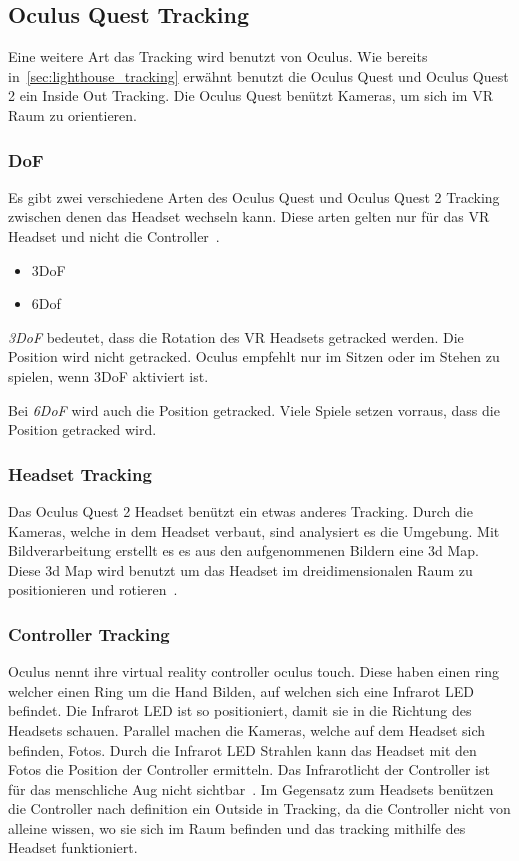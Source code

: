\subsection{Oculus Quest Tracking}
\label{sec:oculus_quest_tracking}

Eine weitere Art das Tracking wird benutzt von Oculus.
Wie bereits in~\ref{sec:lighthouse_tracking} erwähnt benutzt die Oculus Quest und Oculus Quest 2 ein Inside Out Tracking.
Die Oculus Quest benützt Kameras, um sich im VR Raum zu orientieren.

\subsubsection{DoF}

Es gibt zwei verschiedene Arten des Oculus Quest und Oculus Quest 2 Tracking zwischen denen das Headset wechseln kann.
Diese arten gelten nur für das VR Headset und nicht die Controller~\cite{oculus_support_headset_tracking}.

\begin{itemize}
    \item 3DoF
    \item 6Dof
\end{itemize}

\emph{3DoF} bedeutet, dass die Rotation des VR Headsets getracked werden.
Die Position wird nicht getracked.
Oculus empfehlt nur im Sitzen oder im Stehen zu spielen, wenn 3DoF aktiviert ist.

Bei \emph{6DoF} wird auch die Position getracked.
Viele Spiele setzen vorraus, dass die Position getracked wird.

\subsubsection{Headset Tracking}

Das Oculus Quest 2 Headset benützt ein etwas anderes Tracking.
Durch die Kameras, welche in dem Headset verbaut, sind analysiert es die Umgebung.
Mit Bildverarbeitung erstellt es es aus den aufgenommenen Bildern eine 3d Map.
Diese 3d Map wird benutzt um das Headset im dreidimensionalen Raum zu positionieren und rotieren~\cite{MECHATECH}.

\subsubsection{Controller Tracking}

Oculus nennt ihre virtual reality controller oculus touch.
Diese haben einen ring welcher einen Ring um die Hand Bilden, auf welchen sich eine Infrarot LED befindet.
Die Infrarot LED ist so positioniert, damit sie in die Richtung des Headsets schauen.
Parallel machen die Kameras, welche auf dem Headset sich befinden, Fotos.
Durch die Infrarot LED Strahlen kann das Headset mit den Fotos die Position der Controller ermitteln.
Das Infrarotlicht der Controller ist für das menschliche Aug nicht sichtbar~\cite{Gajsek_2022}.
Im Gegensatz zum Headsets benützen die Controller nach definition ein Outside in Tracking, da die Controller nicht von alleine wissen, wo sie sich im Raum befinden und das tracking mithilfe des Headset funktioniert.

